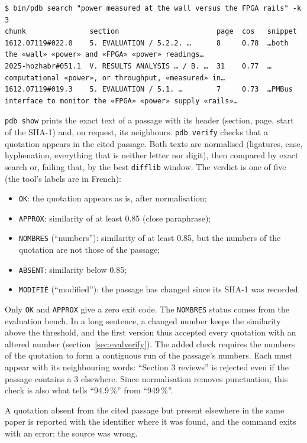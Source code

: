 \documentclass[11pt,a4paper]{article}
\newcommand{\cmd}[1]{\texttt{#1}}
\begin{document}
\begin{lstlisting}
$ bin/pdb search "power measured at the wall versus the FPGA rails" -k 3
chunk               section                       page  cos   snippet
1612.07119#022.0    5. EVALUATION / 5.2.2. …      8     0.78  …both the «wall» «power» and «FPGA» «power» readings…
2025-hozhabr#051.1  V. RESULTS ANALYSIS … / B. …  31    0.77  …computational «power», or throughput, «measured» in…
1612.07119#019.3    5. EVALUATION / 5.1. …        7     0.73  …PMBus interface to monitor the «FPGA» «power» supply «rails»…
\end{lstlisting}

\cmd{pdb show} prints the exact text of a passage with its header (section, page, start of
the SHA-1) and, on request, its neighbours. \cmd{pdb verify} checks that a quotation appears
in the cited passage. Both texts are normalised (ligatures, case, hyphenation, everything
that is neither letter nor digit), then compared by exact search or, failing that, by the
best \cmd{difflib} window. The verdict is one of five (the tool's labels are in French):
\begin{itemize}
  \item \cmd{OK}: the quotation appears as is, after normalisation;
  \item \cmd{APPROX}: similarity of at least 0.85 (close paraphrase);
  \item \cmd{NOMBRES} (``numbers''): similarity of at least 0.85, but the numbers of the
    quotation are not those of the passage;
  \item \cmd{ABSENT}: similarity below 0.85;
  \item \cmd{MODIFIÉ} (``modified''): the passage has changed since its SHA-1 was recorded.
\end{itemize}
Only \cmd{OK} and \cmd{APPROX} give a zero exit code. The \cmd{NOMBRES} status comes from the
evaluation bench. In a long sentence, a changed number keeps the similarity above the
threshold, and the first version thus accepted every quotation with an altered number
(section~\ref{sec:evalverify}). The added check requires the numbers of the quotation to
form a contiguous run of the passage's numbers. Each must appear with its neighbouring
words: ``Section 3 reviews'' is rejected even if the passage contains a 3 elsewhere. Since
normalisation removes punctuation, this check is also what tells ``94.9\,\%'' from
``949\,\%''.

A quotation absent from the cited passage but present elsewhere in the same paper is
reported with the identifier where it was found, and the command exits with an error: the
source was wrong.
\end{document}
